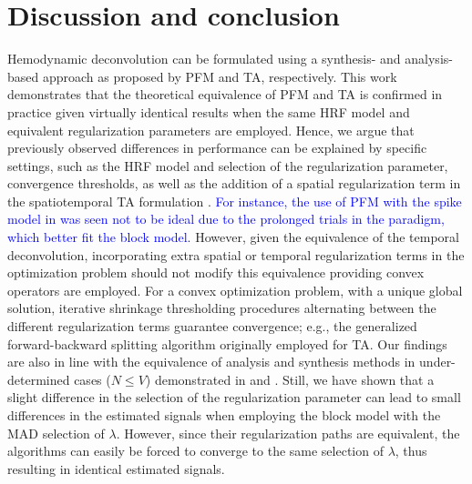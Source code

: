 
\section{Discussion and conclusion}

Hemodynamic deconvolution can be formulated using a synthesis- and
analysis-based approach as proposed by PFM and TA, respectively. This work
demonstrates that the theoretical equivalence of PFM and TA is confirmed in
practice given virtually identical results when the same HRF model and
equivalent regularization parameters are employed. Hence, we argue that
previously observed differences in performance can be explained by specific
settings, such as the HRF model and selection of the regularization parameter,
convergence thresholds, as well as the addition of a spatial regularization term
in the spatiotemporal TA formulation \citep{Karahanoglu2013TotalactivationfMRI}.
\textcolor{blue}{For instance, the use of PFM with the spike model in
\citep{Tan_2017} was seen not to be ideal due to the prolonged trials in the
paradigm, which better fit the block model.} However, given the equivalence of
the temporal deconvolution, incorporating extra spatial or temporal
regularization terms in the optimization problem should not modify this
equivalence providing convex operators are employed. For a convex optimization
problem, with a unique global solution, iterative shrinkage thresholding
procedures alternating between the different regularization terms guarantee
convergence; e.g., the generalized forward-backward splitting
\citep{Raguet2013GeneralizedForwardBackward} algorithm originally employed for
TA. Our findings are also in line with the equivalence of analysis and synthesis
methods in under-determined cases (\(N \leq V\)) demonstrated in
\citep{Elad2007Analysisversussynthesis} and \citep{ortelli2019synthesis}. Still,
we have shown that a slight difference in the selection of the regularization
parameter can lead to small differences in the estimated signals when employing
the block model with the MAD selection of $\lambda$. However, since their
regularization paths are equivalent, the algorithms can easily be forced to
converge to the same selection of $\lambda$, thus resulting in identical
estimated signals.

